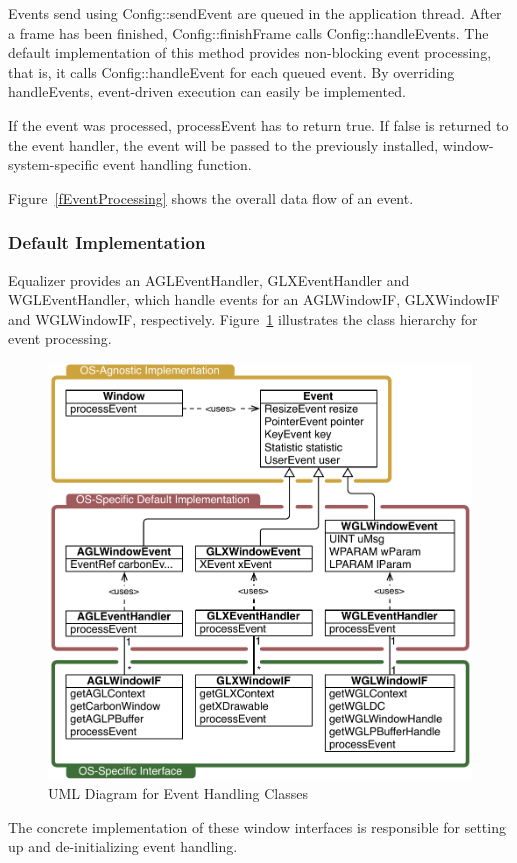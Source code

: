 \documentclass[10pt,a4]{scrartcl}
\newcommand{\fig}[1]{Figure~\ref{#1}}
\begin{document}
Events send using \textsf{Config::sendEvent} are queued in the
application thread. After a frame has been finished,
\textsf{Config::finishFrame} calls \textsf{Config::handleEvents}. The
default implementation of this method provides non-blocking event
processing, that is, it calls \textsf{Config::handleEvent} for each
queued event. By overriding \textsf{handleEvents}, event-driven
execution can easily be implemented.

If the event was processed, \textsf{processEvent} has to return
\textsf{true}. If \textsf{false} is returned to the event handler, the
event will be passed to the previously installed, window-system-specific
event handling function.

\fig{fEventProcessing} shows the overall data flow of an event.

\subsubsection{Default Implementation}

Equalizer provides an \textsf{AGLEvent\-Handler},
\textsf{GLXEventHandler} and \textsf{WGL\-Event\-Handler}, which handle
events for an \textsf{AGLWindowIF}, \textsf{GLXWindowIF} and
\textsf{WGLWindowIF}, respectively. \fig{fEventUML} illustrates the
class hierarchy for event processing.

\begin{figure}
  \includegraphics[width=.618\textwidth]{images/eventUML.pdf}
  {\caption{\label{fEventUML}UML Diagram for Event Handling Classes}}
\end{figure}
The concrete implementation of these window interfaces is responsible
for setting up and de-initializing event handling.
\end{document}
